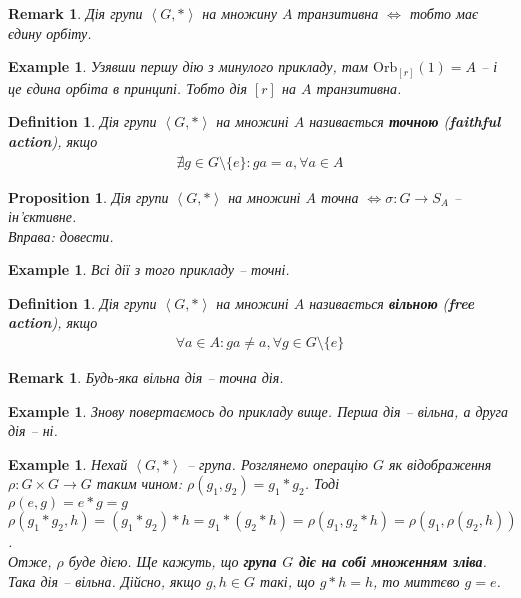 \documentclass[a4paper, 10pt]{article}
\theoremstyle{theoremdd}
\theoremstyle{theoremdd}
\newtheorem{definition}[theorem]{Definition}
\theoremstyle{theoremdd}
\theoremstyle{theoremdd}
\theoremstyle{theoremdd}
\newtheorem{example}[theorem]{Example}
\theoremstyle{theoremdd}
\theoremstyle{theoremdd}
\theoremstyle{theoremdd}
\theoremstyle{theoremdd}
\newtheorem{proposition}[theorem]{Proposition}
\theoremstyle{theoremdd}
\theoremstyle{theoremdd}
\newtheorem{remark}[theorem]{Remark}
\theoremstyle{theoremdd}
\theoremstyle{theoremdd}
\theoremstyle{theoremdd}
\theoremstyle{theoremdd}
\newcommand\Orb{\text{Orb}}
\begin{document}
\begin{remark}
Дія групи $\left< G,*\right>$ на множину $A$ транзитивна $\iff$ тобто має єдину орбіту.
\end{remark}

\begin{example}
Узявши першу дію з минулого прикладу, там $\Orb_{[r]}(1) = A$ -- і це єдина орбіта в принципі. Тобто дія $[r]$ на $A$ транзитивна.
\end{example}

\begin{definition}
Дія групи $\left< G,*\right>$ на множині $A$ називається \textbf{точною} (\textbf{faithful action}), якщо
\begin{align*}
\nexists g \in G \setminus \{e\} : ga = a, \forall a \in A
\iffalse \forall g \in G \setminus \{e\}: \exists a \in A: ga \neq a \fi
\end{align*}
\end{definition}

\begin{proposition}
Дія групи $\left< G,*\right>$ на множині $A$ точна $\iff \sigma \colon G \to S_A$ -- ін'єктивне.\\
\textit{Вправа: довести.}
\end{proposition}

\begin{example}
Всі дії з того прикладу -- точні.
\end{example}

\begin{definition}
Дія групи $\left< G,*\right>$ на множині $A$ називається \textbf{вільною} (\textbf{free action}), якщо
\begin{align*}
\forall a \in A: ga \neq a, \forall g \in G \setminus \{e\}
\end{align*}
\end{definition}

\begin{remark}
Будь-яка вільна дія -- точна дія.
\end{remark}

\begin{example}
Знову повертаємось до прикладу вище. Перша дія -- вільна, а друга дія -- ні.
\end{example}

\begin{example}
Нехай $\left< G,*\right>$ -- група. Розглянемо операцію $G$ як відображення $\rho \colon G \times G \to G$ таким чином: $\rho(g_1,g_2) = g_1*g_2$. Тоді\\
$\rho(e,g) = e*g = g$\\
$\rho(g_1*g_2,h) = (g_1*g_2)*h = g_1*(g_2*h) = \rho(g_1,g_2*h) = \rho(g_1,\rho(g_2,h))$.\\
Отже, $\rho$ буде дією. Ще кажуть, що \textbf{група $G$ діє на собі множенням зліва}.\\
Така дія -- вільна. Дійсно, якщо $g,h \in G$ такі, що $g*h = h$, то миттєво $g = e$.
\end{example}
\end{document}
